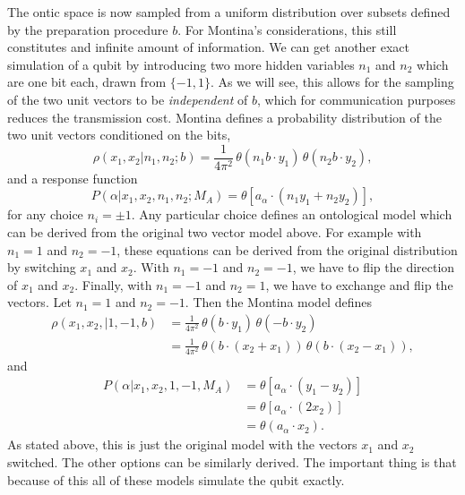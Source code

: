 \documentclass[12pt,draft]{article}
\theoremstyle{definition}
\theoremstyle{plain}
\begin{document}
    The ontic space is now sampled from a uniform
    distribution over subsets defined by the preparation
    procedure $b$. For Montina's considerations, this still
    constitutes and infinite amount of information. We can
    get another exact simulation of a qubit by introducing
    two more hidden variables $n_1$ and $n_2$ which are one
    bit each, drawn from $\{-1,1\}$. As we will see, this
    allows for the sampling of the two unit vectors to be
    \textit{independent} of $b$, which for communication
    purposes reduces the transmission cost. Montina defines
    a probability distribution of the two unit vectors
    conditioned on the bits, 
    \begin{equation}
        \rho(x_1, x_2 | n_1, n_2; b)
        = \frac{1}{4\pi^2} \, \theta(n_1 b \cdot 
        y_1) \, \theta(n_2 b \cdot y_2),
    \end{equation}
    and a response function
    \begin{equation}
        P(\alpha | x_1, x_2, n_1, n_2; M_A)
        = \theta\left[a_\alpha \cdot (n_1 y_1 +
        n_2 y_2)\right],
    \end{equation}
    for any choice $n_i = \pm 1$. Any particular choice
    defines an ontological model which can be
    derived from the original two vector model above. For
    example with $n_1 = 1$ and $n_2 = -1$, these equations
    can be derived from the original distribution by
    switching $x_1$ and $x_2$. With $n_1 = -1$ and $n_2 =
    -1$, we have to flip the direction of $x_1$ and $x_2$.
    Finally, with $n_1= -1$ and $n_2 = 1$, we have to
    exchange and flip the vectors.
    {
        \color{red}
        Let $n_1 = 1$ and $n_2 = -1$. Then the Montina model
        defines
        \begin{align}
            \rho(x_1, x_2, | 1, -1, b)
            &= \frac{1}{4\pi^2} \, 
            \theta(b \cdot y_1) \, \theta(-b \cdot y_2) \\
            &= \frac{1}{4\pi^2} \,
            \theta(b \cdot (x_2 + x_1)) \, 
            \theta(b \cdot (x_2 - x_1)),
        \end{align}
        and
        \begin{align}
            P(\alpha | x_1, x_2, 1, -1, M_A)
            &= \theta\left[
                a_{\alpha} \cdot (y_1 - y_2)
            \right] \\
            &= \theta\left[
                a_\alpha \cdot (2 x_2)
            \right] \\
            &= \theta(a_\alpha \cdot x_2).
        \end{align}
        As stated above, this is just the original model
        with the vectors $x_1$ and $x_2$ switched. The other
        options can be similarly derived. The important
        thing is that because of this all of these models
        simulate the qubit exactly.
    }
\end{document}
